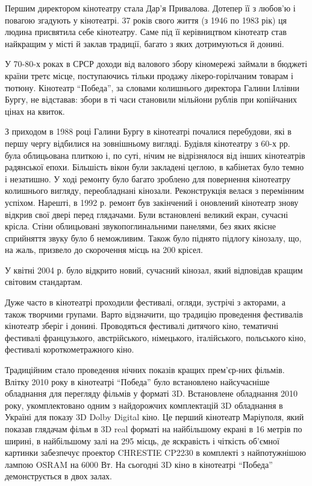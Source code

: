 
Першим директором кінотеатру стала Дар'я Привалова. Дотепер її з любов'ю і
повагою згадують у кінотеатрі. 37 років свого життя (з 1946 по 1983 рік) ця
людина присвятила себе кінотеатру. Саме під її керівництвом кінотеатр став
найкращим у місті й заклав традиції, багато з яких дотримуються й донині.

У 70-80-х роках в СРСР доходи від валового збору кіномережі займали в бюджеті
країни третє місце, поступаючись тільки продажу лікеро-горілчаним товарам і
тютюну. Кінотеатр \enquote{Победа}, за словами колишнього директора Галини Іллівни
Бургу, не відставав: збори в ті часи становили мільйони рублів при копійчаних
цінах на квиток.


З приходом в 1988 році Галини Бургу в кінотеатрі почалися перебудови, які в
першу чергу відбилися на зовнішньому вигляді. Будівля кінотеатру з 60-х рр.
була облицьована плиткою і, по суті, нічим не відрізнялося від інших
кінотеатрів радянської епохи. Більшість вікон були закладені цеглою, в
кабінетах було темно і незатишно. У ході ремонту було багато зроблено для
повернення кінотеатру колишнього вигляду, переобладнані кінозали. Реконструкція
велася з перемінним успіхом. Нарешті, в 1992 р. ремонт був закінчений і
оновлений кінотеатр знову відкрив свої двері перед глядачами. Були встановлені
великий екран, сучасні крісла. Стіни облицьовані звукопоглинальними панелями,
без яких якісне сприйняття звуку було б неможливим. Також було піднято підлогу
кінозалу, що, на жаль, призвело до скорочення місць на 200 крісел.


У квітні 2004 р. було відкрито новий, сучасний кінозал, який відповідав кращим
світовим стандартам.

Дуже часто в кінотеатрі проходили фестивалі, огляди, зустрічі з акторами, а
також творчими групами. Варто відзначити, що традицію проведення фестивалів
кінотеатр зберіг і донині. Проводяться фестивалі дитячого кіно, тематичні
фестивалі французького, австрійського, німецького, італійського, польського
кіно, фестивалі короткометражного кіно.

Традиційним стало проведення нічних показів кращих прем'єр\hyp{}них фільмів. Влітку
2010 року в кінотеатрі \enquote{Победа} було встановлено найсучасніше обладнання для
перегляду фільмів у форматі 3D. Встановлене обладнання 2010 року,
укомплектовано одним з найдорожчих комплектацій 3D обладнання в Україні для
показу 3D Dolby Digital кіно. Це перший кінотеатр Маріуполя, який показав
глядачам фільм в 3D real форматі на найбільшому екрані в 16 метрів по ширині, в
найбільшому залі на 295 місць, де яскравість і чіткість об'ємної картинки
забезпечує проектор CHRESTIE CP2230 в комплекті з найпотужнішою лампою OSRAM на
6000 Вт. На сьогодні 3D кіно в кінотеатрі \enquote{Победа} демонструється в двох залах.

